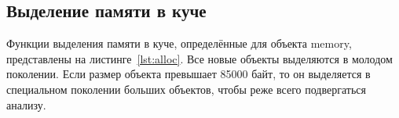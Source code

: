 %
%
%
%
%
%
%
%	
%
%	
%
%
%
%
%		
%		
%		
%		



\subsection{Выделение памяти в куче}

Функции выделения памяти в куче, определённые для объекта memory, представлены на листинге~\ref{lst:alloc}. Все новые объекты выделяются в молодом поколении. Если размер объекта превышает 85000 байт, то он выделяется в специальном поколении больших объектов, чтобы реже всего подвергаться анализу.

